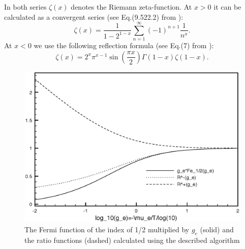 In both series $\zeta(x)$ denotes the Riemann zeta-function.
At $x > 0$ it can be calculated as a convergent series (see Eq.(9.522.2) from \cite{gradshtein}): %
\begin{equation}
\zeta(x) = \frac{1}{1-2^{1-x}} \sum_{n=1}^\infty{(-1)^{n+1} \frac{1}{n^x}}.
\end{equation}
At $x < 0$ we use the following reflection formula (see Eq.(7) from \cite{mcleod}): %
\begin{equation}
\zeta(x) = 2^x \pi^{x-1} \sin(\frac{\pi x}{2}) \Gamma(1-x) \zeta(1-x).
\end{equation}

\begin{figure}[ht]
\centering
\includegraphics[scale=0.6]{FermiFunction.eps}
\caption{The Fermi function of the index of 1/2 multiplied by $g_e$ (solid) and the ratio functions (dashed) calculated using the described algorithm}
\end{figure}

